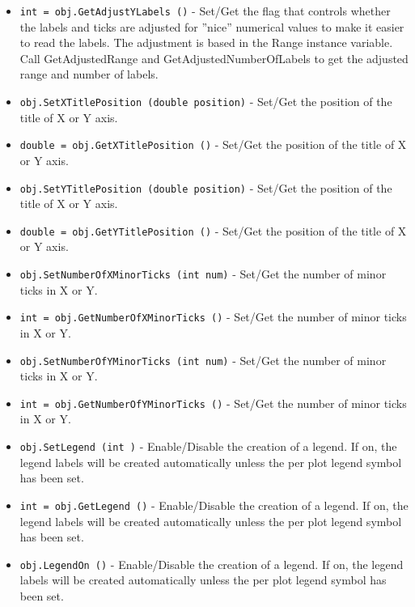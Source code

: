 \begin{itemize}
\item  \verb|int = obj.GetAdjustYLabels ()| -  Set/Get the flag that controls whether the labels and ticks are
 adjusted for ''nice'' numerical values to make it easier to read 
 the labels. The adjustment is based in the Range instance variable.
 Call GetAdjustedRange and GetAdjustedNumberOfLabels to get the adjusted
 range and number of labels.

\item  \verb|obj.SetXTitlePosition (double position)| -  Set/Get the position of the title of X or Y axis.

\item  \verb|double = obj.GetXTitlePosition ()| -  Set/Get the position of the title of X or Y axis.

\item  \verb|obj.SetYTitlePosition (double position)| -  Set/Get the position of the title of X or Y axis.

\item  \verb|double = obj.GetYTitlePosition ()| -  Set/Get the position of the title of X or Y axis.

\item  \verb|obj.SetNumberOfXMinorTicks (int num)| -  Set/Get the number of minor ticks in X or Y.

\item  \verb|int = obj.GetNumberOfXMinorTicks ()| -  Set/Get the number of minor ticks in X or Y.

\item  \verb|obj.SetNumberOfYMinorTicks (int num)| -  Set/Get the number of minor ticks in X or Y.

\item  \verb|int = obj.GetNumberOfYMinorTicks ()| -  Set/Get the number of minor ticks in X or Y.

\item  \verb|obj.SetLegend (int )| -  Enable/Disable the creation of a legend. If on, the legend labels will
 be created automatically unless the per plot legend symbol has been
 set.

\item  \verb|int = obj.GetLegend ()| -  Enable/Disable the creation of a legend. If on, the legend labels will
 be created automatically unless the per plot legend symbol has been
 set.

\item  \verb|obj.LegendOn ()| -  Enable/Disable the creation of a legend. If on, the legend labels will
 be created automatically unless the per plot legend symbol has been
 set.


\end{itemize}

